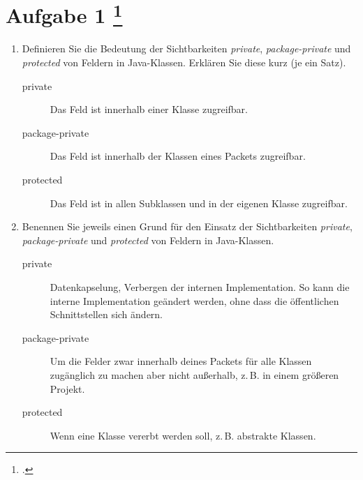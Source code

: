 \documentclass{lehramt-informatik-aufgabe}
\begin{document}
\section{Aufgabe 1
\footcite{66116:2021:03}}

\begin{enumerate}


\item Definieren Sie die Bedeutung der Sichtbarkeiten \emph{private},
\emph{package-private} und \emph{protected} von Feldern in Java-Klassen.
Erklären Sie diese kurz (je ein Satz).

\begin{liAntwort}
\begin{description}
\item[private]
Das Feld ist innerhalb einer Klasse zugreifbar.

\item[package-private]
Das Feld ist innerhalb der Klassen eines Packets zugreifbar.

\item[protected]
Das Feld ist in allen Subklassen und in der eigenen Klasse zugreifbar.

\end{description}
\end{liAntwort}


\item Benennen Sie jeweils einen Grund für den Einsatz der
Sichtbarkeiten \emph{private}, \emph{package-private} und
\emph{protected} von Feldern in Java-Klassen.

\begin{liAntwort}
\begin{description}
\item[private]

Datenkapselung, Verbergen der internen Implementation. So kann die
interne Implementation geändert werden, ohne dass die öffentlichen
Schnittstellen sich ändern.

\item[package-private]

Um die Felder zwar innerhalb deines Packets für alle Klassen zugänglich
zu machen aber nicht außerhalb, z.\,B. in einem größeren Projekt.

\item[protected]

Wenn eine Klasse vererbt werden soll, z.\,B. abstrakte Klassen.

\end{description}
\end{liAntwort}

\end{enumerate}
\end{document}
